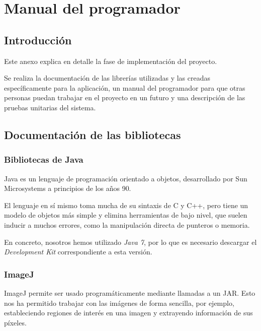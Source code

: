 \chapter{Manual del programador}


\section{Introducción}
Este anexo explica en detalle la fase de implementación del proyecto.

Se realiza la documentación de las librerías utilizadas y las creadas específicamente para la aplicación, un manual del programador para que otras personas puedan trabajar en el proyecto en un futuro y una descripción de las pruebas unitarias del sistema.

\section{Documentación de las bibliotecas}\label{bib}

\subsection{Bibliotecas de Java}
Java es un lenguaje de programación orientado a objetos, desarrollado por Sun Microsystems a principios de los años 90.

El lenguaje en sí mismo toma mucha de su sintaxis de C y C++, pero tiene un modelo de objetos más simple y elimina herramientas de bajo nivel, que suelen inducir a muchos errores, como la manipulación directa de punteros o memoria.

En concreto, nosotros hemos utilizado \textit{Java 7}, por lo que es necesario descargar el \textit{Development Kit} correspondiente a esta versión.

\subsection{ImageJ}
ImageJ permite ser usado programáticamente mediante llamadas a un JAR. Esto nos ha permitido trabajar con las imágenes de forma sencilla, por ejemplo, estableciendo regiones de interés en una imagen y extrayendo información de sus píxeles.

